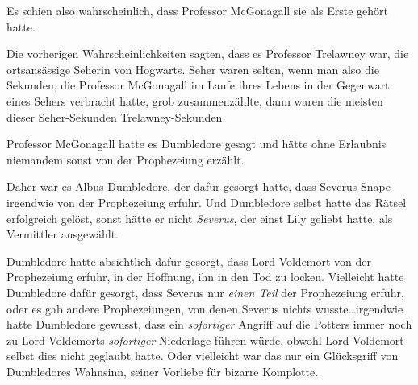 Es schien also wahrscheinlich, dass Professor McGonagall sie als Erste gehört hatte.

Die vorherigen Wahrscheinlichkeiten sagten, dass es Professor Trelawney war, die ortsansässige Seherin von Hogwarts. Seher waren selten, wenn man also die Sekunden, die Professor McGonagall im Laufe ihres Lebens in der Gegenwart eines Sehers verbracht hatte, grob zusammenzählte, dann waren die meisten dieser Seher-Sekunden Trelawney-Sekunden.

Professor McGonagall hatte es Dumbledore gesagt und hätte ohne Erlaubnis niemandem sonst von der Prophezeiung erzählt.

Daher war es Albus Dumbledore, der dafür gesorgt hatte, dass Severus Snape irgendwie von der Prophezeiung erfuhr. Und Dumbledore selbst hatte das Rätsel erfolgreich gelöst, sonst hätte er nicht \emph{Severus}, der einst Lily geliebt hatte, als Vermittler ausgewählt.

Dumbledore hatte absichtlich dafür gesorgt, dass Lord Voldemort von der Prophezeiung erfuhr, in der Hoffnung, ihn in den Tod zu locken. Vielleicht hatte Dumbledore dafür gesorgt, dass Severus nur \emph{einen Teil} der Prophezeiung erfuhr, oder es gab andere Prophezeiungen, von denen Severus nichts wusste…irgendwie hatte Dumbledore gewusst, dass ein \emph{sofortiger} Angriff auf die Potters immer noch zu Lord Voldemorts \emph{sofortiger} Niederlage führen würde, obwohl Lord Voldemort selbst dies nicht geglaubt hatte. Oder vielleicht war das nur ein Glücksgriff von Dumbledores Wahnsinn, seiner Vorliebe für bizarre Komplotte.

